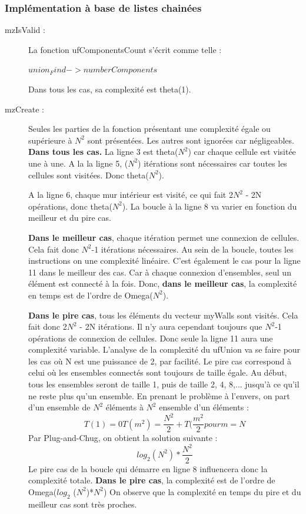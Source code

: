 \documentclass[11pt]{article}
\begin{document}
\subsubsection{Implémentation à base de listes chainées}
\begin{description}
\item[mzIsValid :]La fonction ufComponentsCount s'écrit comme telle :
\begin{codebox}
\li \Return $union_Find->numberComponents$
\end{codebox}
Dans tous les cas, sa complexité est theta(1).



\item[mzCreate :] Seules les parties de la fonction présentant une complexité égale ou supérieure à $N^{2}$ sont présentées. Les autres sont ignorées car négligeables. \textbf{Dans tous les cas.} La ligne 3 est theta($N^{2}$) car chaque cellule est visitée une à une. A la la ligne 5, ($N^{2}$) itérations sont nécessaires car toutes les cellules sont visitées. Donc theta($N^{2}$).

A la ligne 6, chaque mur intérieur est visité, ce qui fait 2$N^{2}$ - 2N opérations, donc theta($N^{2}$).
La boucle à la ligne 8 va varier en fonction du meilleur et du pire cas. 

\textbf{Dans le meilleur cas}, chaque itération permet une connexion de cellules. Cela fait donc $N^{2}$-1 itérations nécessaires. Au sein de la boucle, toutes les instructions on une complexité linéaire. C'est également le cas pour la ligne 11 dans le meilleur des cas. Car à chaque connexion d'ensembles, seul un élément est connecté à la fois. Donc,\textbf{ dans le meilleur cas}, la complexité en temps est de l'ordre de Omega($N^{2}$). 

\textbf{Dans le pire cas}, tous les éléments du vecteur myWalls sont visités. Cela fait donc 2$N^{2}$ - 2N  itérations. Il n'y aura cependant toujours que $N^{2}$-1 opérations de connexion de cellules. Donc seule la ligne 11 aura une complexité variable. L'analyse de la complexité du ufUnion va se faire pour les cas où N est une puissance de 2, par facilité. Le pire cas correspond à celui où les ensembles connectés sont toujours de taille égale. Au début, tous les ensembles seront de taille 1, puis de taille 2, 4, 8,... jusqu'à ce qu'il ne reste plus qu'un ensemble. En prenant le problème à l'envers, on part d'un ensemble de $N^{2}$ éléments à $N^{2}$ ensemble d'un éléments :
\begin{equation}
	T(1) = 0
	T(m^{2}) = \frac{N^{2}}{2} + T(\frac{m^{2}}{2} pour m = N
\end{equation}
Par Plug-and-Chug, on obtient la solution suivante :
\begin{equation}
	log_{2} (N^{2}) * \frac{N^{2}}{2}
\end{equation}
Le pire cas de la boucle qui démarre en ligne 8 influencera donc la complexité totale.
\textbf{Dans le pire cas}, la complexité est de l'ordre de Omega($log_{2}$ ($N^{2}$)*$N^{2}$)
On observe que la complexité en temps du pire et du meilleur cas sont très proches.
\end{description}
\end{document}
